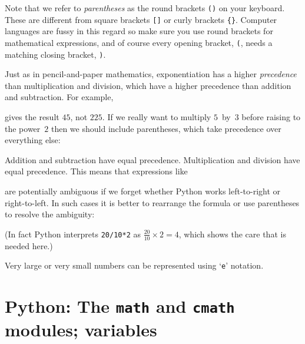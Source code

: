 {}
\noindent
Note that we refer to \emph{parentheses} as the round brackets  {\tt ()} on your keyboard. 
These are different from square brackets {\tt []} or curly brackets {\tt \{\}}. Computer languages are
fussy in this regard so make sure you use round brackets for mathematical expressions, and 
of course every opening bracket, {\tt (}, needs a matching closing bracket, {\tt )}. 

Just as in pencil-and-paper mathematics, exponentiation has a higher \textit{precedence}
than multiplication and division, which have a higher precedence than addition and subtraction.
For example,

{}

\noindent
gives the result $45$, not $225$. If we really want to multiply $5$~by~$3$ before raising to
the power~$2$ then we should include parentheses, which take precedence over everything else:

{}

\noindent
Addition and subtraction have equal precedence. Multiplication and division have equal precedence.
This means that expressions like 

{}

\noindent
are potentially ambiguous if we forget whether Python works left-to-right or right-to-left.
In such cases it is better to rearrange the formula or use parentheses to resolve the ambiguity:

{}
\noindent
(In fact Python interprets {\tt 20/10*2} as $\frac{20}{10} \times 2 = 4$, which shows the 
care that is needed here.)

Very large or very small numbers can be represented using `\texttt{e}' notation.





\section{Python: The \texttt{math} and \texttt{cmath} modules; variables}
\label{sec:built-in}

